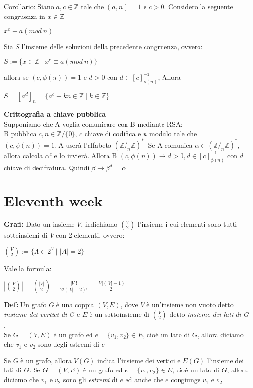 \documentclass[12pt, a4paper]{article}
\begin{document}
Corollario: Siano $a,c\in\mathbb{Z}$ tale che $(a,n)=1$ e $c>0$. Considero la seguente congruenza 
in $x\in\mathbb{Z}$
\begin{center}
    $x^{c}\equiv a (mod\ n)$
\end{center}
Sia $S$ l'insieme delle soluzioni della precedente congruenza, ovvero:
\begin{center}
    $S:=\{x\in\mathbb{Z}\mid x^{c}\equiv a(mod\ n)\}$
\end{center}
allora se $(c,\phi(n))=1$ e $d>0$ con $d\in[c]^{-1}_{\phi(n)}$, Allora
\begin{center}
    $S=[a^{d}]_{n}=\{a^{d}+kn\in\mathbb{Z}\mid k\in\mathbb{Z}\}$
\end{center}

\textbf{Crittografia a chiave pubblica}\\Supponiamo che A voglia comunicare con B mediante RSA:\\
B pubblica $c,n\in\mathbb{Z}/\{0\}$, $c$ chiave di codifica e $n$ modulo tale che $(c,\phi(n))=1$. A userà
l'alfabeto $(\mathbb{Z}/_{n}\mathbb{Z})^{*}$. Se A comunica $\alpha\in(\mathbb{Z}/_{n}\mathbb{Z})^{*}$, allora 
calcola $\alpha^{c}$ e lo invierà. Allora B $(c,\phi(n))\rightarrow d>0, d\in[c]^{-1}_{\phi(n)}$ con $d$ 
chiave di decifratura. Quindi $\beta\rightarrow\beta^{d}=\alpha$


\newpage
\section{Eleventh week}
\textbf{Grafi:} Dato un insieme $V$, indichiamo $\binom{V}{2}$ l'insieme i cui elementi sono tutti sottoinsiemi di 
$V$ con 2 elementi, ovvero:
\begin{center}
    $\binom{V}{2}:=\{A\in 2^{V}\mid |A|=2\}$
\end{center}
Vale la formula:
\begin{center}
    $|\binom{V}{2}|=\binom{|V|}{2}=\frac{|V|!}{2!(|V|-2)!}=\frac{|V|(|V|-1)}{2}$
\end{center}

\textbf{Def:} Un grafo $G$ è una coppia $(V,E)$, dove $V$ è un'insieme non vuoto detto \textit{insieme
dei vertici di $G$} e $E$ è un sottoinsieme di $\binom{V}{2}$ detto \textit{insieme dei lati di $G$}.\\
Se $G=(V,E)$ è un grafo ed $e=\{v_{1},v_{2}\}\in E$, cioé un lato di $G$, allora diciamo che $v_{1}$ e
$v_{2}$ sono degli estremi di $e$

Se $G$ è un grafo, allora $V(G)$ indica l'insieme dei vertici e $E(G)$ l'insieme dei lati di $G$. Se 
$G=(V,E)$ è un grafo ed $e=\{v_{1},v_{2}\}\in E$, cioé un lato di $G$, allora diciamo che $v_{1}$ e
$v_{2}$ sono gli \textit{estremi} di $e$ ed anche che $e$ congiunge $v_{1}$ e $v_{2}$
\end{document}
